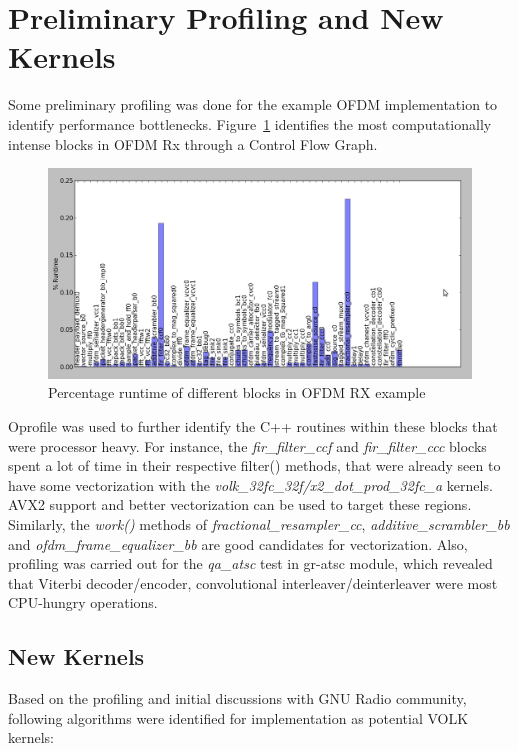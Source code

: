 \documentclass[a4paper,12pt,oneside]{article}
\begin{document}
\section{Preliminary Profiling and New Kernels}
\label{sec:profiling}
Some preliminary profiling was done for the example OFDM implementation to identify performance bottlenecks. Figure~\ref{fig:1} identifies the most computationally intense blocks in OFDM Rx through a Control Flow Graph. 

\begin{figure}[h] 
\centering\includegraphics[width=5in]{figure/ofdm_rx.png}
\caption{Percentage runtime of different blocks in OFDM RX example \label{fig:1} }
\end{figure}

Oprofile \cite{oprofile} was used to further identify the C++ routines within these blocks that were processor heavy. For instance, the {\it fir\_filter\_ccf} and {\it fir\_filter\_ccc} blocks spent a lot of time in their respective filter() methods, that were already seen to have some vectorization with the {\it volk\_32fc\_32f/x2\_dot\_prod\_32fc\_a} kernels. AVX2 support and better vectorization can be used to target these regions. Similarly, the {\it work()} methods of {\it fractional\_resampler\_cc}, {\it additive\_scrambler\_bb} and {\it ofdm\_frame\_equalizer\_bb} are good candidates for vectorization. Also, profiling was carried out for the {\it qa\_atsc} test in gr-atsc module, which revealed that Viterbi decoder/encoder, convolutional interleaver/deinterleaver were most CPU-hungry operations.

\subsection{New Kernels}

Based on the profiling and initial discussions with GNU Radio community, following algorithms were identified for implementation as potential VOLK kernels:
\end{document}
